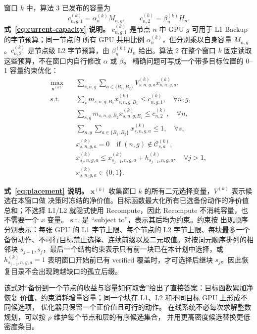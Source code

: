 \documentclass[UTF8,11pt,a4paper,fontset=fandol]{ctexart}
\newcommand{\BOne}{B_1}
\newcommand{\BTwo}{B_2}
\begin{document}
窗口 $k$ 中，算法 3 已发布的容量为
\begin{equation}
  c_{n,g,1}^{(k)}=\alpha_n^{(k)}M_{n,g},\qquad
  c_{n,2}^{(k)}=\beta_n^{(k)}H_n.
  \label{eq:current-capacity}
\end{equation}
\noindent\textbf{式~\eqref{eq:current-capacity} 说明。}
$c_{n,g,1}^{(k)}$ 是节点 $n$ 中 GPU $g$ 可用于 L1 Backup 的字节预算；同一节点的
所有 GPU 共用比例 $\alpha_n^{(k)}$，但分别乘以自身容量 $M_{n,g}$。$c_{n,2}^{(k)}$
是节点级 L2 字节预算，由 $\beta_n^{(k)}H_n$ 给出。算法 2 在整个窗口 $k$ 固定读取
这些预算，不在窗口内自行修改 $\alpha$ 或 $\beta$。
精确问题可写成一个带多目标位置的 0--1 容量约束优化：
\begin{equation}
  \begin{aligned}
    \max_{\mathbf x^{(k)}}\quad
      &\sum_{s,n,g}\sum_{a\in\{\BOne,\BTwo\}}
       V_{s,n,g,a}^{(k)}x_{s,n,g,a}^{(k)},\\
    \mathrm{s.t.}\quad
      &\sum_s m_{s,n,g,\BOne}x_{s,n,g,\BOne}^{(k)}
       \le c_{n,g,1}^{(k)},\quad\forall n,g,\\
      &\sum_{s,g}m_{s,n,g,\BTwo}x_{s,n,g,\BTwo}^{(k)}
       \le c_{n,2}^{(k)},\quad\forall n,\\
      &\sum_{n,g}\sum_{a\in\{\BOne,\BTwo\}}
       x_{s,n,g,a}^{(k)}\le 1,\quad\forall s,\\
      &x_{s,n,g,a}^{(k)}=0
       \quad\text{if }(n,g)\notin\mathcal C_{s,a}^{(k)},\\
      &x_{s_j,n,g,a}^{(k)}
       \le x_{s_{j-1},n,g,a}^{(k)}+h_{s_{j-1},n,g,a}^{(k)},
       \quad\forall j>1,\\
      &x_{s,n,g,a}^{(k)}\in\{0,1\}.
  \end{aligned}
  \label{eq:placement}
\end{equation}

\noindent\textbf{式~\eqref{eq:placement} 说明。}
$\mathbf x^{(k)}$ 收集窗口 $k$ 的所有二元选择变量，$V^{(k)}$ 表示候选在本窗口做
决策时冻结的净价值。目标函数最大化所有已选备份动作的净价值总和；不选择 L1/L2
就隐式使用 Recompute，因此 Recompute 不消耗容量，也不需要一个 $x$ 变量。
$\mathrm{s.t.}$ 是 ``subject to''，表示其后均为约束。约束按
出现顺序分别表示：每张 GPU 的 L1 字节上限、每个节点的 L2 字节上限、每块最多一个
备份动作、不可行目标禁止选择、连续前缀以及二元取值。对按词元顺序排列的相邻块
$s_{j-1},s_j$，最后一个结构约束表示只有前一块已在本计划中选择，或
$h_{s_{j-1},n,g,a}^{(k)}=1$ 表明窗口开始前已有 verified 覆盖时，才可选择后继块
$s_j$。因此恢复目录不会出现跨越缺口的孤立后缀。

该式对“备份到一个节点的收益与容量如何取舍”给出了直接答案：目标函数累加净恢复
价值，约束消耗增量容量；同一个块在 L1、L2 和不同目标 GPU 上形成不同候选项，
优化器只保留一个正价值且可行的动作。
在线系统不必每次求解整数规划，可以按 $\rho$ 维护每个节点和层的有序候选集合，
并用更高密度候选替换更低密度条目。
\end{document}
